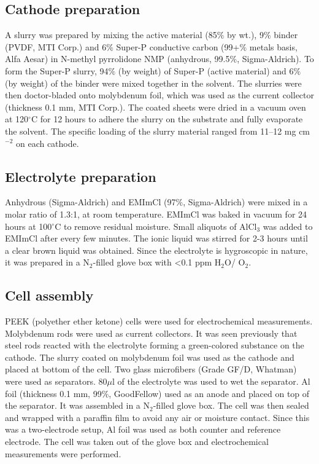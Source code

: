 \documentclass{article}
\begin{document}
\subsection{Cathode preparation}
A slurry was prepared by mixing the active material (85$\%$ by wt.), 9$\%$ binder (PVDF, MTI Corp.) and 6$\%$ Super-P conductive carbon (99+$\%$ metals basis, Alfa Aesar) in N-methyl pyrrolidone NMP (anhydrous, 99.5$\%$, Sigma-Aldrich). To form the Super-P slurry, 94$\%$ (by weight) of Super-P (active material) and 6$\%$ (by weight) of the binder were mixed together in the solvent. The slurries were then doctor-bladed onto molybdenum foil, which was used as the current collector (thickness 0.1 mm, MTI Corp.). The coated sheets were dried in a vacuum oven at 120$^{\circ}$C for 12 hours to adhere the slurry on the substrate and fully evaporate the solvent. The specific loading of the slurry material ranged from 11--12 mg cm$^{-2}$ on each cathode. 

\subsection{Electrolyte preparation}
Anhydrous  (Sigma-Aldrich) and EMImCl (97$\%$, Sigma-Aldrich) were mixed in a molar ratio of 1.3:1, at room temperature. EMImCl was baked in vacuum for 24 hours at 100$^{\circ}$C to remove residual moisture. Small aliquots of AlCl$_3$ was added to EMImCl after every few minutes. The ionic liquid was stirred for 2-3 hours until a clear brown liquid was obtained. Since the electrolyte is hygroscopic in nature, it was prepared in a N$_2$-filled glove box with <0.1 ppm H$_2$O/ O$_2$. 

\subsection{Cell assembly}
PEEK (polyether ether ketone) cells were used for electrochemical measurements. Molybdenum rods were used as current collectors. It was seen previously that steel rods reacted with the electrolyte forming a green-colored substance on the cathode. The slurry coated on molybdenum foil was used as the cathode and placed at bottom of the cell. Two glass microfibers (Grade GF/D, Whatman) were used as separators. 80$\mu$l of the electrolyte was used to wet the separator. Al foil (thickness 0.1 mm, 99$\%$, GoodFellow) used as an anode and placed on top of the separator. It was assembled in a N$_2$-filled glove box. The cell was then sealed and wrapped with a paraffin film to avoid any air or moisture contact. Since this was a two-electrode setup, Al foil was used as both counter and reference electrode. The cell was taken out of the glove box and electrochemical measurements were performed. 
\end{document}
